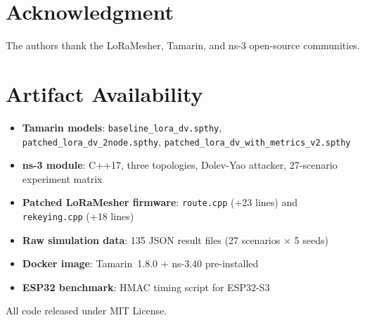 \documentclass[10pt,journal,compsoc]{IEEEtran}
\begin{document}
\section*{Acknowledgment}
The authors thank the LoRaMesher, Tamarin, and ns-3 open-source
communities.

\appendix
\section{Artifact Availability}
\label{app:artifact}

\begin{itemize}
  \item \textbf{Tamarin models}:
    \texttt{baseline\_lora\_dv.spthy},
    \texttt{patched\_lora\_dv\_2node.spthy},
    \texttt{patched\_lora\_dv\_with\_metrics\_v2.spthy}
  \item \textbf{ns-3 module}: C++17, three topologies,
    Dolev-Yao attacker, 27-scenario experiment matrix
  \item \textbf{Patched LoRaMesher firmware}:
    \texttt{route.cpp} (+23 lines) and \texttt{rekeying.cpp} (+18 lines)
  \item \textbf{Raw simulation data}: 135 JSON result files
    (27 scenarios $\times$ 5 seeds)
  \item \textbf{Docker image}: Tamarin~1.8.0 + ns-3.40 pre-installed
  \item \textbf{ESP32 benchmark}: HMAC timing script for ESP32-S3
\end{itemize}

All code released under MIT License.



\end{document}
